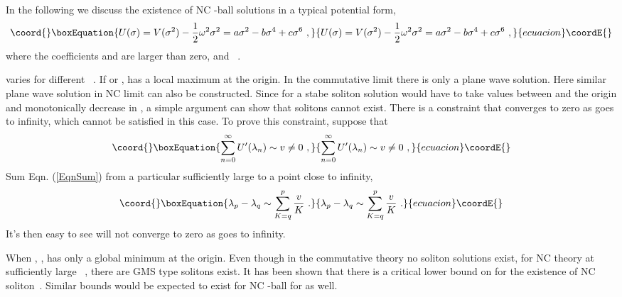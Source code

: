 \documentclass[a4paper,a4paper]{article}
\begin{document}
In the following we discuss the existence of NC \coordHE{}-ball solutions in
a typical potential form, 
\begin{equation}\coord{}\boxEquation{
U(\sigma)=V(\sigma^2)-\frac
12\omega^2\sigma^2=a\sigma^2-b\sigma^4+c\sigma^6\ ,                                                \label{PotU}
}{
U(\sigma)=V(\sigma^2)-\frac
12\omega^2\sigma^2=a\sigma^2-b\sigma^4+c\sigma^6\ ,                                                }{ecuacion}\coordE{}\end{equation}
where the coefficients \coordHE{} and \coordHE{} are larger than zero, and \coordHE{}\ . 

\coordHE{} varies for different \myHighlight{$\omega$}\coordHE{}\ . If
\coordHE{} or \coordHE{}, \coordHE{} has a local
maximum at the origin. In the commutative limit there is only a plane
wave solution.  Here similar plane wave solution in NC limit can also
be constructed.  Since for a stabe soliton solution \coordHE{} would have
to take values between \coordHE{} and the origin and monotonically decrease in \coordHE{}
 \cite{Dur}, a simple argument can show that solitons cannot exist. 
There is a constraint that 
\coordHE{}
converges to zero as \coordHE{} goes to infinity, which cannot be satisfied
in this case. To prove this constraint, suppose that
\begin{equation}\coord{}\boxEquation{
\sum_{n=0}^\infty U'(\lambda_n)\sim v\neq 0\ ,
}{
\sum_{n=0}^\infty U'(\lambda_n)\sim v\neq 0\ ,
}{ecuacion}\coordE{}\end{equation}
Sum Eqn. (\ref{EqnSum}) from a particular \coordHE{} sufficiently large to
a point \coordHE{} close to infinity,
\begin{equation}\coord{}\boxEquation{
\lambda_p-\lambda_q\sim \sum_{K=q}^{p}\frac vK\ .
}{
\lambda_p-\lambda_q\sim \sum_{K=q}^{p}\frac vK\ .
}{ecuacion}\coordE{}\end{equation}
It's then easy to see \coordHE{} will not converge to zero as \coordHE{}
goes to infinity.

When \coordHE{} , \coordHE{} , \coordHE{}
has only a global minimum at the origin. Even though in the
commutative theory no soliton solutions exist, for NC theory at
sufficiently large \myHighlight{$\theta$}\coordHE{}\ , there are GMS type solitons exist. It has
been shown that there is a critical lower bound on \myHighlight{$\theta$}\coordHE{} for the
existence of NC soliton~\cite{Zhou}. Similar bounds would be expected
to exist for NC \coordHE{}-ball for \coordHE{} as well.
\end{document}
